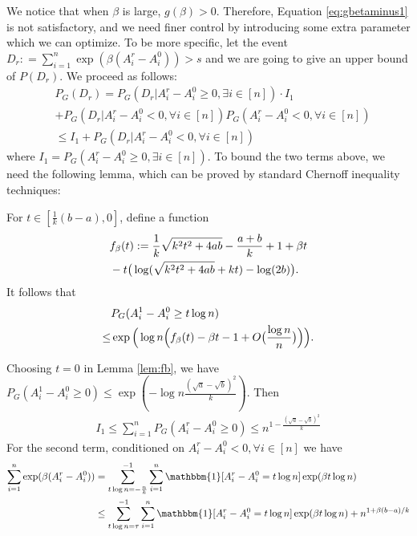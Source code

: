 \documentclass{article}
\begin{document}
We notice that when $\beta$ is large, $g(\beta) > 0$. Therefore, Equation \eqref{eq:gbetaminus1} is not satisfactory, and
we need finer control by introducing some extra parameter which we can optimize. To be more specific, let
the event $D_r : = \sum_{i=1}^n\exp ( \beta(A^r_i-A^0_i)) > s$
and we are going to give an upper bound of $P(D_r)$. We proceed as follows: 
\begin{align*}
&P_G(D_r) = 
P_G(D_r| A_i^r - A_i^0 \geq 0, \exists i\in [n])
\cdot I_1 \\
&+ P_G(D_r | A_i^r - A_i^0  < 0, \forall i\in [n])
P_G(  A_i^r - A_i^0  < 0 , \forall i \in [n] ) \\
& \leq I_1
+ P_G(D_r | A_i^r - A_i^0  < 0, \forall i\in [n])
\end{align*}
where $I_1 = P_G( A_i^r - A_i^0 \geq 0, \exists i\in [n])$.
To bound the two terms above, we need the following lemma, which can be proved by standard Chernoff inequality techniques:
\begin{lemma}\label{lem:fb}
	For $t\in [\frac{1}{k}(b-a), 0]$,
	define a function
	\begin{align}
	&f_{\beta}(t):=\frac{1}{k}\sqrt{k^2t^2+4ab} -\frac{a+b}{k} +1 +\beta t  \notag\\
	&-t\big(\log(\sqrt{k^2t^2+4ab}+kt)-\log(2b) \big). \label{eq:fbetat}
	\end{align}
	It follows that
	\begin{align} 
	& P_G(A^1_i-A^0_i\ge t\log n)  \notag\\
	\le &  \exp\Big(\log n \Big(f_{\beta}(t) -\beta t  - 1 + O\big(\frac{\log n}{n}\big) \Big)\Big) .
	\end{align}
\end{lemma}
Choosing $t=0$ in Lemma \ref{lem:fb}, we have
$P_G(A^1_i-A^0_i\ge 0 ) \leq \exp(-\log n \frac{(\sqrt{a}-\sqrt{b})^2}{k})$.
Then
\begin{align}\label{eq:I_1}
I_1 \leq \sum_{i=1}^n P_G( A_i^r - A_i^0 \geq 0) \leq n^{1-\frac{(\sqrt{a}-\sqrt{b})^2}{k}}
\end{align}
For the second term,
conditioned on $A_i^r - A_i^0  < 0, \forall i\in [n]$ we have
\begin{align}
\sum_{i=1}^n\exp ( \beta(A^r_i-A^0_i))
& = \sum_{t\log n =-\frac{n}{k}}^{-1}\sum_{i=1}^n \mathbbm{1}[A^r_i - A^0_i = t \log n] \exp ( \beta  t\log n) \label{eq:split_tlogn} \\ 
& \leq
\sum_{t\log n =\tau}^{-1}\sum_{i=1}^n \mathbbm{1}[A^r_i - A^0_i = t \log n]\exp ( \beta  t\log n) + n^{1+\beta(b-a)/k}
\end{align}
\end{document}
